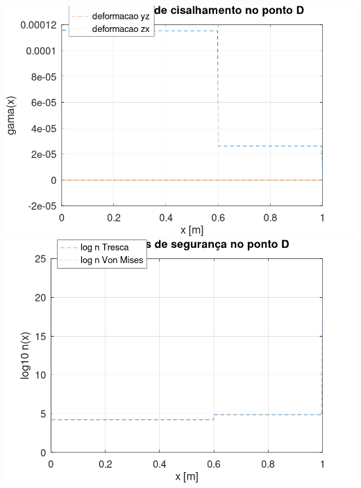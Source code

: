 \documentclass[10pt]{article}
\begin{document}
\begin{center}
    \includegraphics[scale=0.25]{figure43.png}
    \includegraphics[scale=0.25]{figure44.png}
\end{center}
\end{document}
